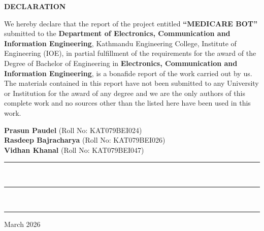 \thispagestyle{empty}

\begin{center}
\textbf{\Large DECLARATION}
\end{center}

\vspace{1.5cm}

\noindent
We hereby declare that the report of the project entitled \textbf{``MEDICARE BOT''} submitted to the \textbf{Department of Electronics, Communication and Information Engineering}, Kathmandu Engineering College, Institute of Engineering (IOE), in partial fulfillment of the requirements for the award of the Degree of Bachelor of Engineering in \textbf{Electronics, Communication and Information Engineering}, is a bonafide report of the work carried out by us. The materials contained in this report have not been submitted to any University or Institution for the award of any degree and we are the only authors of this complete work and no sources other than the listed here have been used in this work.

\vspace{2.6cm}

\noindent
\begin{minipage}[t]{0.62\textwidth}
\textbf{Prasun Paudel} (Roll No: KAT079BEI024)\\[0.7cm]
\textbf{Rasdeep Bajracharya} (Roll No: KAT079BEI026)\\[0.7cm]
\textbf{Vidhan Khanal} (Roll No: KAT079BEI047)
\end{minipage}
\hfill
\begin{minipage}[t]{0.33\textwidth}
\rule{\linewidth}{0.4pt}\\[0.7cm]
\rule{\linewidth}{0.4pt}\\[0.7cm]
\rule{\linewidth}{0.4pt}
\end{minipage}

\vfill

\noindent
March 2026
